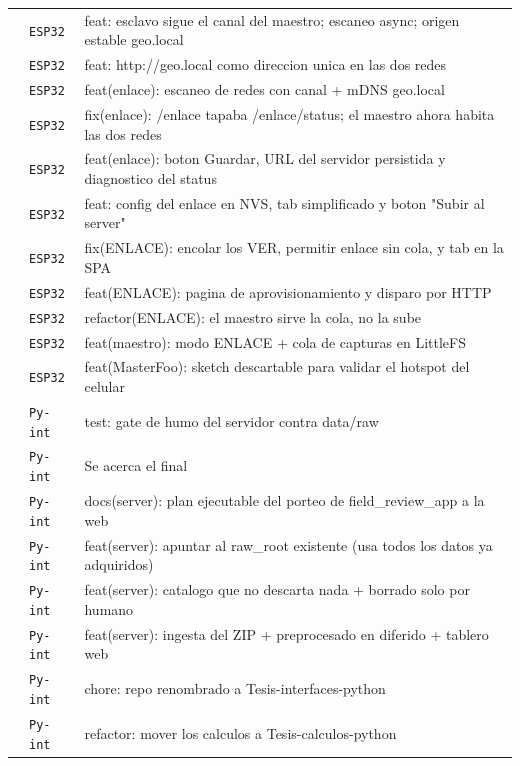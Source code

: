\begin{longtable}{@{}p{1.7cm} p{1.5cm} p{12.2cm}@{}}
 & \texttt{\scriptsize ESP32} & feat: esclavo sigue el canal del maestro; escaneo async; origen estable geo.local \\
 & \texttt{\scriptsize ESP32} & feat: http://geo.local como direccion unica en las dos redes \\
 & \texttt{\scriptsize ESP32} & feat(enlace): escaneo de redes con canal + mDNS geo.local \\
 & \texttt{\scriptsize ESP32} & fix(enlace): /enlace tapaba /enlace/status; el maestro ahora habita las dos redes \\
 & \texttt{\scriptsize ESP32} & feat(enlace): boton Guardar, URL del servidor persistida y diagnostico del status \\
 & \texttt{\scriptsize ESP32} & feat: config del enlace en NVS, tab simplificado y boton "Subir al server" \\
 & \texttt{\scriptsize ESP32} & fix(ENLACE): encolar los VER, permitir enlace sin cola, y tab en la SPA \\
 & \texttt{\scriptsize ESP32} & feat(ENLACE): pagina de aprovisionamiento y disparo por HTTP \\
 & \texttt{\scriptsize ESP32} & refactor(ENLACE): el maestro sirve la cola, no la sube \\
 & \texttt{\scriptsize ESP32} & feat(maestro): modo ENLACE + cola de capturas en LittleFS \\
 & \texttt{\scriptsize ESP32} & feat(MasterFoo): sketch descartable para validar el hotspot del celular \\
 & \texttt{\scriptsize Py-int} & test: gate de humo del servidor contra data/raw \\
 & \texttt{\scriptsize Py-int} & Se acerca el final \\
 & \texttt{\scriptsize Py-int} & docs(server): plan ejecutable del porteo de field\_review\_app a la web \\
 & \texttt{\scriptsize Py-int} & feat(server): apuntar al raw\_root existente (usa todos los datos ya adquiridos) \\
 & \texttt{\scriptsize Py-int} & feat(server): catalogo que no descarta nada + borrado solo por humano \\
 & \texttt{\scriptsize Py-int} & feat(server): ingesta del ZIP + preprocesado en diferido + tablero web \\
 & \texttt{\scriptsize Py-int} & chore: repo renombrado a Tesis-interfaces-python \\
 & \texttt{\scriptsize Py-int} & refactor: mover los calculos a Tesis-calculos-python \\

\end{longtable}
